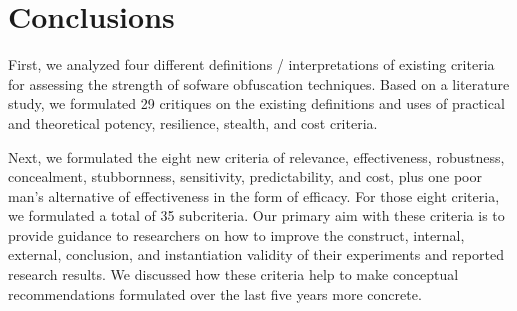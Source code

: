 \section{Conclusions}
\label{sec:conclusions}

First, we analyzed four different definitions / interpretations of existing criteria for assessing the strength of sofware obfuscation techniques. Based on a literature study, we formulated 29 critiques on the existing definitions and uses of practical and theoretical potency, resilience, stealth, and cost criteria. 

Next, we formulated the eight new criteria of relevance, effectiveness, robustness,
concealment, stubbornness, sensitivity, predictability, and cost, plus one poor man's alternative of effectiveness in the form of efficacy. For those eight criteria, we formulated a total of 35 subcriteria. Our primary aim with these criteria is to provide guidance to researchers on how to improve the construct, internal, external, conclusion, and instantiation validity of their experiments and reported research results. We discussed how these criteria help to make conceptual recommendations formulated over the last five years more concrete.  
